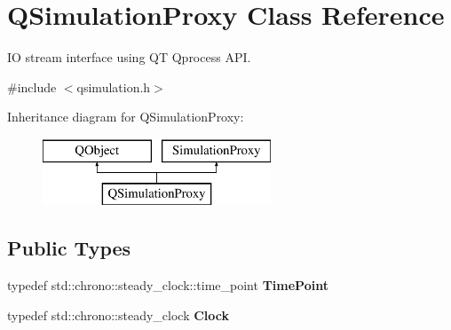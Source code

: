 \hypertarget{class_q_simulation_proxy}{}\section{Q\+Simulation\+Proxy Class Reference}
\label{class_q_simulation_proxy}


IO stream interface using QT Qprocess A\+PI.  




{\ttfamily \#include $<$qsimulation.\+h$>$}

Inheritance diagram for Q\+Simulation\+Proxy\+:\begin{figure}[H]
\begin{center}
\leavevmode
\includegraphics[height=2.000000cm]{class_q_simulation_proxy}
\end{center}
\end{figure}
\subsection*{Public Types}
\begin{DoxyCompactItemize}
\item 
\hypertarget{class_q_simulation_proxy_a85e46e407b5003b30885178dbf01edfb}{}\label{class_q_simulation_proxy_a85e46e407b5003b30885178dbf01edfb} 
typedef std\+::chrono\+::steady\+\_\+clock\+::time\+\_\+point {\bfseries Time\+Point}
\item 
\hypertarget{class_q_simulation_proxy_a4dc47dcbf523e98cb6290707e88297dc}{}\label{class_q_simulation_proxy_a4dc47dcbf523e98cb6290707e88297dc} 
typedef std\+::chrono\+::steady\+\_\+clock {\bfseries Clock}
\end{DoxyCompactItemize}
